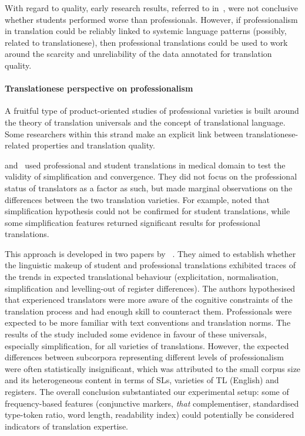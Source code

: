 With regard to quality, early research results, referred to in~\citet{Daems2017}, were not conclusive whether students performed worse than professionals. However, if professionalism in translation could be reliably linked to systemic language patterns (possibly, related to translationese), then professional translations could be used to work around the scarcity and unreliability of the data annotated for translation quality.

\paragraph{Translationese perspective on professionalism} A fruitful type of product-oriented studies of professional varieties is built around the theory of translation universals and the concept of translational language. Some researchers within this strand make an explicit link between translationese-related properties and translation quality.  

\citet{Corpas2008} and~\citet{Ilisei2012} used professional and student translations in medical domain to test the validity of simplification and convergence. They did not focus on the professional status of translators as a factor as such, but made marginal observations on the differences between the two translation varieties. For example, \citet{Corpas2008} noted that simplification hypothesis could not be confirmed for student translations, while some simplification features returned significant results for professional translations.

This approach is developed in two papers by ~\citet{Redelinghuys2015,Redelinghuys2016}. They aimed to establish whether the linguistic makeup of student and professional translations exhibited traces of the trends in expected translational behaviour (explicitation, normalisation, simplification and levelling-out of register differences). The authors hypothesised that experienced translators were more aware of the cognitive constraints of the translation process and had enough skill to counteract them. Professionals were expected to be more familiar with text conventions and translation norms. The results of the study included some evidence in favour of these universals, especially simplification, for all varieties of translations. However, the expected differences between subcorpora representing different levels of professionalism were often statistically insignificant, which was attributed to the small corpus size and its heterogeneous content in terms of SLs, varieties of TL (English) and registers. The overall conclusion substantiated our experimental setup: some of frequency-based features (conjunctive markers, \textit{that} complementiser, standardised type-token ratio, word length, readability index) could potentially be considered indicators of translation expertise.

